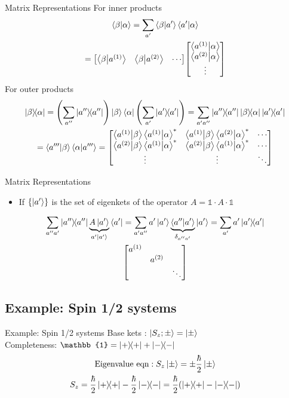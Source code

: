 \begin{frame}{Matrix Representations}
	For inner products
	\begin{gather*}
		\ip{\beta}{\alpha} = \sum_{a'} \ip{\beta}{a'}\ip{a'}{\alpha} \\
		= \mqty[ \ip{\beta}{a^{(1)}} & \ip{\beta}{a^{(2)}} & \cdots]
		\mqty[ \ip{a^{(1)}}{\alpha} \\
			\ip{a^{(2)}}{\alpha} \\
			\vdots]
		\\
	\end{gather*}
	For outer products
	\begin{gather*}
		\op{\beta}{\alpha} = \qty(\sum_{a''} \op{a''}) \ket\beta \bra{\alpha} \qty(\sum_{a'} \op{a'})=\sum_{a' a''} \op{a''}\op{\beta}{\alpha} \op{a'} \\
		= \ip{a'''}{\beta} \ip{\alpha}{a'''} = \mqty[
			\ip{a^{(1)}}{\beta}\ip{a^{(1)}}{\alpha}^* & \ip{a^{(1)}}{\beta}\ip{a^{(2)}}{\alpha}^* & \cdots \\
			\ip{a^{(2)}}{\beta}\ip{a^{(1)}}{\alpha}^* & \ip{a^{(2)}}{\beta}\ip{a^{(1)}}{\alpha}^* & \cdots \\
			\vdots & \vdots & \ddots
		]
	\end{gather*}
\end{frame}

\begin{frame}{Matrix Representations}
	\begin{itemize}
		\item If $\{\ket{a'}\}$ is the set of eigenkets of the operator $A = \mathbb{1}\cdot A \cdot \mathbb{1}$
	\end{itemize}
	\begin{gather*}
		\sum_{a'' a'} \op{a''} \underbrace{A\ket{a'}}_{a'\ket{a'}}\bra{a'} = \sum_{a' a''} a'\ket{a'}\underbrace{\ip{a''}{a'}}_{\delta_{a'' a'}} \ket{a'} = \sum_{a'} a'\op{a'}\\
		\mqty[\dmat{ a^{(1)},a^{(2)},\ddots }]
	\end{gather*}
\end{frame}

\subsection{Example: Spin 1/2 systems}
\begin{frame}{Example: Spin 1/2 systems}
	Base kets : $ \ket{S_z;\pm} = \ket{\pm}$\\
	Completeness: $\mathbb{1} = \op{+} + \op{-}$
	\begin{gather*}
		\text{Eigenvalue eqn}: S_z \ket{\pm} = \pm \frac\hbar2 \ket{\pm}\\
		S_z = \frac\hbar2 \op{+} - \frac{\hbar}{2}\op{-} = \frac{\hbar}{2} \qty(\op{+} - \op{-})
	\end{gather*}
\end{frame}

